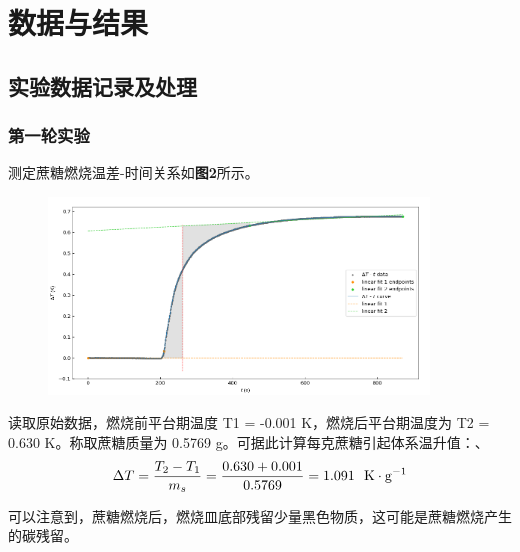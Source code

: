\documentclass[12pt]{article}
\begin{document}
	 \section{数据与结果}
 		\subsection{实验数据记录及处理}
 			\subsubsection{第一轮实验}
			测定蔗糖燃烧温差-时间关系如\textbf{图2}所示。
			\begin{figure}[h]
				\centering
				\includegraphics[width=0.9\textwidth]{2.png}
			\end{figure}
			读取原始数据，燃烧前平台期温度 T1 = -0.001 K，燃烧后平台期温度为 T2 = 0.630 K。称取蔗糖质量为 0.5769 g。可据此计算每克蔗糖引起体系温升值：、
			\begin{equation}
				\Delta T = \frac{T_{2}-T_{1}}{m_{s}} = \frac{0.630+0.001}{0.5769} = 1.091\ \ {\rm K\cdot g^{-1}}
			\end{equation}
			\par
			可以注意到，蔗糖燃烧后，燃烧皿底部残留少量黑色物质，这可能是蔗糖燃烧产生的碳残留。\par
\end{document}
